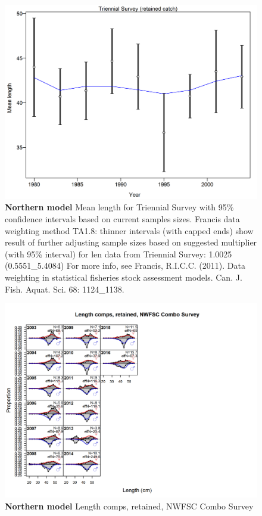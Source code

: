 \documentclass[12pt,]{article}
\begin{document}
\begin{figure}[htbp]
\centering
\includegraphics{./tex2pdf.8516/b1bd915dcd68dc3b7b45ea214f46f9420cd4633f.png}
\caption{\textbf{Northern model} Mean length for Triennial Survey with
95\% confidence intervals based on current samples sizes. Francis data
weighting method TA1.8: thinner intervals (with capped ends) show result
of further adjusting sample sizes based on suggested multiplier (with
95\% interval) for len data from Triennial Survey: 1.0025
(0.5551\_5.4084) For more info, see Francis, R.I.C.C. (2011). Data
weighting in statistical fisheries stock assessment models. Can. J.
Fish. Aquat. Sci. 68: 1124\_1138.
\label{fig:mod1_25_comp_lenfit_data_weighting_TA1.8_Triennial Survey}}
\end{figure}

\begin{figure}[htbp]
\centering
\includegraphics{./r4ss/plots_mod1/comp_lenfit_flt6mkt2.png}
\caption{\textbf{Northern model} Length comps, retained, NWFSC Combo
Survey \label{fig:mod1_26_comp_lenfit_flt6mkt2}}
\end{figure}
\end{document}
